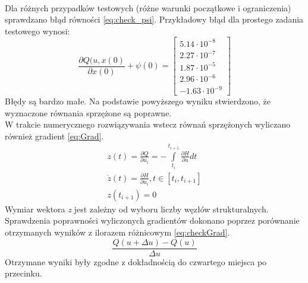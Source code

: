 \paragraph*{}
Dla różnych przypadków testowych (różne warunki początkowe i ograniczenia) sprawdzano błąd równości \eqref{eq:check_psi}. Przykładowy błąd dla prostego zadania testowego wynosi:
\begin{equation}
\frac{\partial Q(u,x(0)}{\partial x(0)}+\psi(0)=
\begin{bmatrix}
5.14\cdot 10^{-8}\\
2.27\cdot 10^{-7}\\
1.87\cdot 10^{-5}\\
2.96\cdot 10^{-6}\\
-1.63\cdot 10^{-9}
\end{bmatrix}
\end{equation}
Błędy są bardzo małe. Na podstawie powyższego wyniku stwierdzono, że wyznaczone równania sprzężone są poprawne.\\
W trakcie numerycznego rozwiązywania wstecz równań sprzężonych wyliczano również gradient \eqref{eq:Grad}.
\begin{equation}
\begin{aligned}
&z(t) = \frac{\partial Q}{\partial u_i}=-\int\limits_{t_i}^{t_{i+1}}\frac{\partial H}{\partial u}dt&\\
&\dot{z}(t) = \frac{\partial H}{\partial u_i}, t\in [t_i,t_{i+1}]&\\
&z(t_{i+1}) = 0
\label{eq:Grad}
\end{aligned}
\end{equation}
Wymiar wektora \textit{z} jest zależny od wyboru liczby węzłów strukturalnych. Sprawdzenia poprawności wyliczonych gradientów dokonano poprzez porównanie otrzymanych wyników z ilorazem różnicowym \eqref{eq:checkGrad}.
\begin{equation}
\label{eq:checkGrad}
\frac{Q(u+\Delta u)-Q(u)}{\Delta u}
\end{equation}
Otrzymane wyniki były zgodne z dokładnością do czwartego miejsca po przecinku.